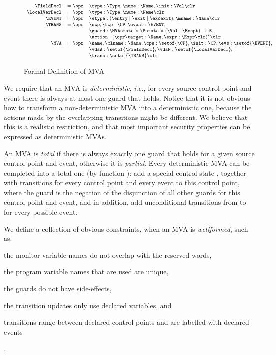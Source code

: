 \begin{figure}[t]
\[{\small
\begin{array}{rcl}
\FieldDecl & = \opr & \type : \Type, \name : \Name, \init : \Val
\clr \\
\LocalVarDecl & = \opr & \type : \Type, \name : \Name \clr \\
\EVENT & = \opr & \etype : (\entry \mid \exit \mid \excexit),
                 \mname : \Name \clr\\
\TRANS & = \opr & \scp, \tcp : \CP, \event : \EVENT, \\
& &
\guard : \MVAstate \times \Pstate \times (\Val \mid \Excpt) \rightarrow \mathbb{B}, \\
&& \action : (\opr \target : \Name, \expr : \Expr \clr)^* \clr\\
\MVA & = \opr & \name, \clname : \Name, \cps : \setof{\CP},
            \init : \CP, \evs : \setof{\EVENT},\\
     &   &  \vdsA : \setof{\FieldDecl}, \vdsP : \setof{\LocalVarDecl},\\
     &   &  \trans : \setof{\TRANS} \clr
\end{array}}
\]
\caption{Formal Definition of MVA}\label{FigMVAForm}
\end{figure}

We require that an MVA is \emph{deterministic}, \emph{i.e.}, for every
source control point and event there is always at most one guard that
holds. Notice that it is not obvious how to transform a
non-deterministic MVA into a deterministic one, because the actions
made by the overlapping transitions might be different. We believe
that this is a realistic restriction, and that most important security
properties can be expressed as deterministic MVAs.

An MVA is \emph{total} if there is always exactly one guard that holds
for a given source control point and event, otherwise it is
\emph{partial}. Every deterministic MVA can be completed into a total
one (by function \complete): add a special control state
\halted, together with transitions for every control point and every event
to this \halted control point, where the guard is the negation of the
disjunction of all other guards for this control point and event, and
in addition, add unconditional transitions from \halted to \halted for
every possible event.


We define a collection of obvious constraints, when an MVA is
\emph{wellformed}, such as:
\begin{inparaenum}
\item the monitor variable names do not overlap with the reserved
words,
\item the program variable names that are used are unique,
\item the guards do not have side-effects,
\item the transition updates only use declared variables, and
\item transitions range between declared control points and are
labelled with declared events
\end{inparaenum}.


